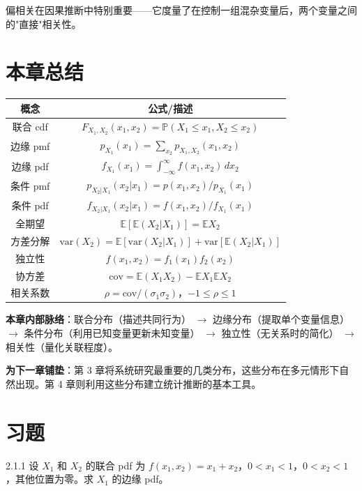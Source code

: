 偏相关在因果推断中特别重要——它度量了在控制一组混杂变量后，两个变量之间的"直接"相关性。

\section{本章总结}\label{sec:chapter2-summary}

\begin{center}
\begin{tabular}{|c|c|}
\hline
\textbf{概念} & \textbf{公式/描述} \\ \hline
联合 cdf & $F_{X_1,X_2}(x_1,x_2) = \mathbb{P}(X_1\leq x_1, X_2\leq x_2)$ \\ \hline
边缘 pmf & $p_{X_1}(x_1) = \sum_{x_2} p_{X_1,X_2}(x_1,x_2)$ \\ \hline
边缘 pdf & $f_{X_1}(x_1) = \int_{-\infty}^{\infty} f(x_1,x_2)\,dx_2$ \\ \hline
条件 pmf & $p_{X_2|X_1}(x_2|x_1) = p(x_1,x_2)/p_{X_1}(x_1)$ \\ \hline
条件 pdf & $f_{X_2|X_1}(x_2|x_1) = f(x_1,x_2)/f_{X_1}(x_1)$ \\ \hline
全期望 & $\mathbb{E}[\mathbb{E}(X_2|X_1)] = \mathbb{E}X_2$ \\ \hline
方差分解 & $\text{var}(X_2) = \mathbb{E}[\text{var}(X_2|X_1)] + \text{var}[\mathbb{E}(X_2|X_1)]$ \\ \hline
独立性 & $f(x_1,x_2) = f_1(x_1)f_2(x_2)$ \\ \hline
协方差 & $\text{cov} = \mathbb{E}(X_1X_2) - \mathbb{E}X_1\mathbb{E}X_2$ \\ \hline
相关系数 & $\rho = \text{cov}/(\sigma_1\sigma_2)$，$-1 \leq \rho \leq 1$ \\ \hline
\end{tabular}
\end{center}

\textbf{本章内部脉络}：联合分布（描述共同行为） $\to$ 边缘分布（提取单个变量信息） $\to$ 条件分布（利用已知变量更新未知变量） $\to$ 独立性（无关系时的简化） $\to$ 相关性（量化关联程度）。

\textbf{为下一章铺垫}：第 3 章将系统研究最重要的几类分布，这些分布在多元情形下自然出现。第 4 章则利用这些分布建立统计推断的基本工具。

\section*{习题}\label{sec:exercises-ch2}

\begin{exercise}{2.1.1}
设 $X_1$ 和 $X_2$ 的联合 pdf 为 $f(x_1, x_2) = x_1 + x_2$，$0 < x_1 < 1$，$0 < x_2 < 1$，其他位置为零。求 $X_1$ 的边缘 pdf。
\end{exercise}


